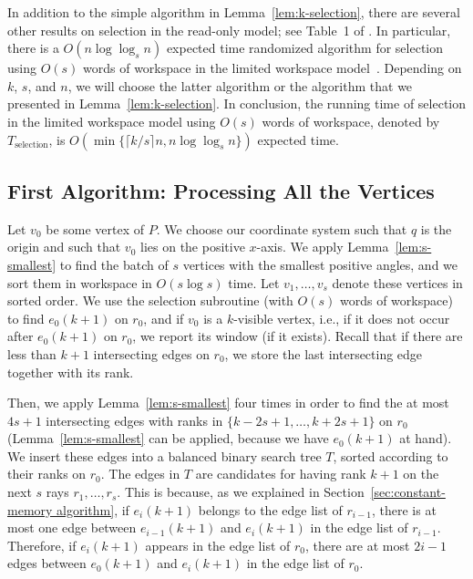 \documentclass[11pt, a4paper]{article}
\begin{document}
In addition to the simple algorithm in Lemma~\ref{lem:k-selection}, 
there are several other results on selection in the read-only model; 
see Table~1 of \cite{chan2014selection}. In particular, there is a
$O(n\log{\log_s{n}})$ expected time randomized algorithm for 
selection using $O(s)$ words of workspace in the 
limited workspace model~\cite{chan2010comparison,munro1996selection}. 
Depending 
on $k$, $s$, and $n$, we will choose the latter algorithm or 
the algorithm that we presented in Lemma~\ref{lem:k-selection}. 
In conclusion, the running time of selection in the 
limited workspace model using $O(s)$ words of workspace, 
denoted by $T_\text{selection}$, is 
$O(\min \{\lceil k/s\rceil n, n\log{\log_s{n}}\})$ expected time. 

\subsection{First Algorithm: Processing All the Vertices}\label{sec:algo1}

Let $v_0$ be some vertex of $P$. 
We choose our coordinate system such that
$q$ is the origin and such that $v_0$ lies on the positive $x$-axis.
We apply Lemma~\ref{lem:s-smallest} to find the batch of $s$ 
vertices with the smallest positive angles, and we 
sort them in workspace in $O(s \log s)$ time. Let $v_1, \dots, v_s$ 
denote these vertices in sorted order. We use the 
selection subroutine (with $O(s)$ words of workspace) to find 
$e_0(k+1)$ on $r_0$, and if $v_0$ is a $k$-visible vertex, i.e., if 
it does not occur after $e_0(k+1)$ on $r_0$, we report
its window (if it exists).  Recall that if there are less than $k+1$
intersecting edges on $r_0$, we store the last intersecting edge 
together with its rank.

Then, we apply Lemma~\ref{lem:s-smallest} four times in order to find 
the at most $4s + 1$ intersecting edges with ranks in 
$\{k - 2s + 1, \dots, k + 2s + 1\}$ on $r_0$
(Lemma~\ref{lem:s-smallest} can be applied, because we have 
$e_0(k+1)$ at hand). We insert these edges 
into a balanced binary search tree $T$, sorted according to 
their ranks on $r_0$. The edges in $T$ are candidates for having 
rank $k + 1$ on the next $s$ rays $r_1, \dots, r_s$. This is because,
as we explained in Section~\ref{sec:constant-memory algorithm}, 
if $e_i(k+1)$ belongs to the edge list of $r_{i-1}$, there is at 
most one edge between $e_{i-1}(k+1)$ and $e_i(k+1)$ in the edge 
list of $r_{i-1}$.
Therefore, if $e_i(k+1)$ appears in the edge list of $r_0$, 
there are at most $2i-1$ edges between $e_0(k+1)$ and
$e_i(k+1)$ in the edge list of $r_0$. 
\end{document}
